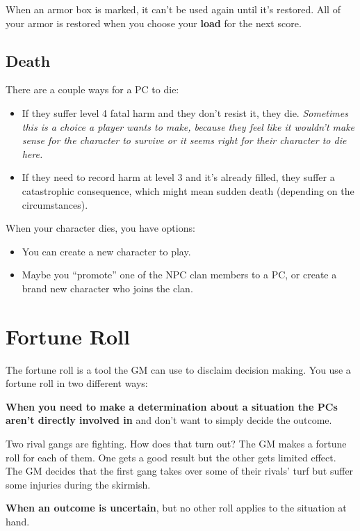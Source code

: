 When an armor box is marked, it can’t be used again until it’s restored. All of your armor is restored when you choose your \textbf{load} for the next score.

\subsection{Death}

There are a couple ways for a PC to die:
\begin{itemize}
\item If they suffer level 4 fatal harm and they don’t resist it, they die. \emph{Sometimes this is a choice a player wants to make, because they feel like it wouldn’t make sense for the character to survive or it seems right for their character to die here.}
\item If they need to record harm at level 3 and it’s already filled, they suffer a catastrophic consequence, which might mean sudden death (depending on the circumstances).
\end{itemize}

When your character dies, you have options:
\begin{itemize}
\item You can create a new character to play.
\item Maybe you ``promote'' one of the NPC clan members to a PC, or create a brand new character who joins the clan.
\end{itemize}

\section{Fortune Roll}

The fortune roll is a tool the GM can use to disclaim decision making. You use a fortune roll in two different ways:

\textbf{When you need to make a determination about a situation the PCs aren’t directly involved in} and don’t want to simply decide the outcome.

\begin{qb}Two rival gangs are fighting. How does that turn out? The GM makes a fortune roll for each of them. One gets a good result but the other gets limited effect. The GM decides that the first gang takes over some of their rivals’ turf but suffer some injuries during the skirmish.\end{qb}

\textbf{When an outcome is uncertain}, but no other roll applies to the situation at hand.

